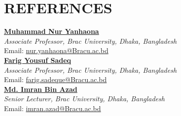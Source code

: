 \documentclass[letterpaper,10.5pt]{article}
\makeatletter
\newcommand{\resumeProjectHeading}[2]{
    \item
    \begin{tabular*}{1.001\textwidth}{l@{\extracolsep{\fill}}r}
      \small#1 & \textbf{\small #2}\\
    \end{tabular*}\vspace{-7pt}
}
\makeatother
\begin{document}
\section{REFERENCES}
\vspace{0pt}
\textbf{\href{https://www.scopus.com/authid/detail.uri?authorId=24722142100}{\color{NavyBlue} Muhammad Nur Yanhaona}} \\
\emph{Associate Professor, Brac University, Dhaka, Bangladesh} \\
Email: \href{mailto:nur.yanhaona@Bracu.ac.bd}{\color{NavyBlue}nur.yanhaona@Bracu.ac.bd} \\
\textbf{\href{https://scholar.google.com/citations?user=ULNaeowAAAAJ&hl=en}{\color{NavyBlue} Farig Yousuf Sadeq}} \\
\emph{Associate Professor, Brac University, Dhaka, Bangladesh} \\
Email: \href{mailto:farig.sadeque@Bracu.ac.bd}{\color{NavyBlue}farig.sadeque@Bracu.ac.bd} \\
\textbf{\href{https://codeforces.com/profile/Imran_Bin_Azad}{\color{NavyBlue} Md. Imran Bin Azad}} \\
\emph{Senior Lecturer, Brac University, Dhaka, Bangladesh} \\
Email: \href{mailto:imran.azad@Bracu.ac.bd}{\color{NavyBlue}imran.azad@Bracu.ac.bd} \\
\vspace{-8pt}







\end{document}
